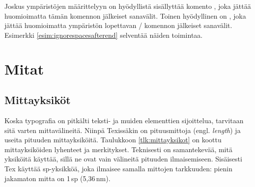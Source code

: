 Joskus ympäristöjen määrittelyyn on hyödyllistä sisällyttää komento
, joka jättää huomioimatta tämän komennon
jälkeiset sanavälit. Toinen hyödyllinen on
, joka jättää huomioimatta ympäristön
lopettavan \-/ komennon jälkeiset sanavälit. Esimerkki
\ref{esim:ignorespacesafterend} selventää näiden toimintaa.

\section{Mitat}
\label{luku:mitat}

\subsection{Mittayksiköt}

Koska typografia on pitkälti teksti- ja muiden elementtien sijoittelua,
tarvitaan sitä varten mittavälineitä. Niinpä Texissäkin on pituusmittoja
(engl. \emph{length}) ja useita pituuden mittayksiköitä. Taulukkoon
\ref{tlk:mittayksikot} on koottu mittayksiköiden lyhenteet ja
merkitykset. Teknisesti on samantekevää, mitä yksiköitä käyttää, sillä
ne ovat vain välineitä pituuden ilmaisemiseen. Sisäisesti Tex käyttää
sp-yksikköä, joka ilmaisee samalla mittojen tarkkuuden: pienin jakamaton
mitta on 1\,sp (5,36\,nm).


